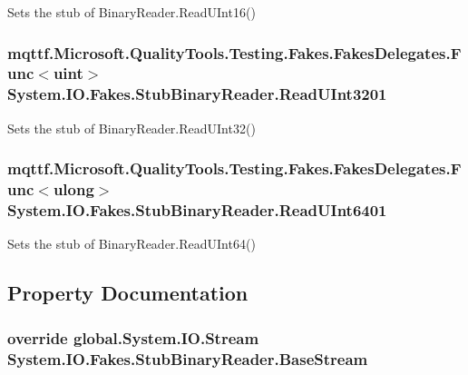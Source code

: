 Sets the stub of Binary\-Reader.\-Read\-U\-Int16()

\hypertarget{class_system_1_1_i_o_1_1_fakes_1_1_stub_binary_reader_abceae04e1d0ec7ebca996e65118969f9}{
\subsubsection[{Read\-U\-Int3201}]{\setlength{\rightskip}{0pt plus 5cm}mqttf.\-Microsoft.\-Quality\-Tools.\-Testing.\-Fakes.\-Fakes\-Delegates.\-Func$<$uint$>$ System.\-I\-O.\-Fakes.\-Stub\-Binary\-Reader.\-Read\-U\-Int3201}}\label{class_system_1_1_i_o_1_1_fakes_1_1_stub_binary_reader_abceae04e1d0ec7ebca996e65118969f9}


Sets the stub of Binary\-Reader.\-Read\-U\-Int32()

\hypertarget{class_system_1_1_i_o_1_1_fakes_1_1_stub_binary_reader_a99152c8803de6c0da7759dd59d53c476}{
\subsubsection[{Read\-U\-Int6401}]{\setlength{\rightskip}{0pt plus 5cm}mqttf.\-Microsoft.\-Quality\-Tools.\-Testing.\-Fakes.\-Fakes\-Delegates.\-Func$<$ulong$>$ System.\-I\-O.\-Fakes.\-Stub\-Binary\-Reader.\-Read\-U\-Int6401}}\label{class_system_1_1_i_o_1_1_fakes_1_1_stub_binary_reader_a99152c8803de6c0da7759dd59d53c476}


Sets the stub of Binary\-Reader.\-Read\-U\-Int64()



\subsection{Property Documentation}
\hypertarget{class_system_1_1_i_o_1_1_fakes_1_1_stub_binary_reader_ab6f06d4c91093f83e053d80e821827ac}{
\subsubsection[{Base\-Stream}]{\setlength{\rightskip}{0pt plus 5cm}override global.\-System.\-I\-O.\-Stream System.\-I\-O.\-Fakes.\-Stub\-Binary\-Reader.\-Base\-Stream\hspace{0.3cm}{\ttfamily [get]}}}\label{class_system_1_1_i_o_1_1_fakes_1_1_stub_binary_reader_ab6f06d4c91093f83e053d80e821827ac}


